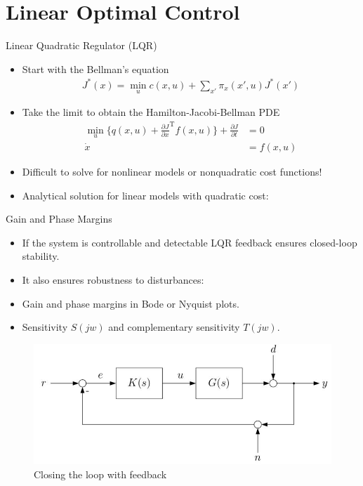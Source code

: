 \documentclass[handout]{beamer}
\begin{document}
\section{Linear Optimal Control}
%
\begin{frame}{Linear Quadratic Regulator (LQR)}
\begin{itemize}
\item Start with the Bellman's equation
\begin{equation*}
\begin{aligned}
J^{*}(x) = \min_u c(x,u) + \sum_{x'} \pi_x(x',u)J^{*}(x')
\end{aligned}
\end{equation*}
\item Take the limit to obtain the Hamilton-Jacobi-Bellman PDE 
\begin{equation*}
\begin{aligned}
\min_u \{ q(x,u) + \frac{\partial J}{\partial x}^{\mathrm{T}}f(x,u) \} + \frac{\partial J}{\partial t} &= 0 \\
\dot{x} &= f(x,u)
\end{aligned}
\end{equation*}
\item Difficult to solve for nonlinear models or nonquadratic cost functions!
\item Analytical solution for linear models with quadratic cost:
\end{itemize}
\end{frame}
%
\begin{frame}{Gain and Phase Margins}
\begin{itemize}
\item If the system is controllable and detectable LQR feedback ensures closed-loop stability.
\item It also ensures robustness to disturbances:
\item Gain and phase margins in Bode or Nyquist plots.
\item Sensitivity $S(jw)$ and complementary sensitivity $T(jw)$.
\end{itemize}
\begin{figure}
\center
\includegraphics[scale=0.4]{closedLoop.jpg}			
\caption{Closing the loop with feedback}
\end{figure}
\end{frame}
\end{document}

